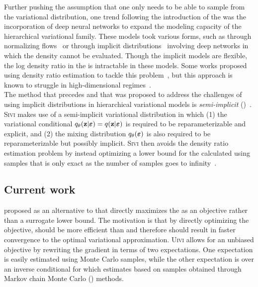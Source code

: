 \documentclass[10pt]{article}
\begin{document}
Further pushing the assumption that one only needs to be able to sample from the variational distribution, one trend following the introduction of the \hvm was the incorporation of deep neural networks to expand the modeling capacity of the hierarchical variational family. These models took various forms, such as through normalizing flows~\citep{Rezende:2015} or through implicit distributions~\citep{Mohamed:2016} involving deep networks in which the density cannot be evaluated. Though the implicit models are flexible, the log density ratio in the \elbo is intractable in these models. Some works proposed using density ratio estimation to tackle this problem~\citep[e.g.,][]{Mohamed:2016,Huszar:2017}, but this approach is known to struggle in high-dimensional regimes~\citep{Sugiyama:2012}.
\\

The method that precedes \uivi and that was proposed to address the challenges of using implicit distributions in hierarchical variational models is \textit{semi-implicit} \vi (\sivi)~\citep{Yin:2018}. \textsc{Sivi} makes use of a semi-implicit variational distribution in which (1) the variational conditional $q_\theta(\mathbf{z}|\bm{\varepsilon})=q(\mathbf{z}|\bm{\varepsilon})$ is required to be reparameterizable and explicit, and (2) the mixing distribution $q_\theta(\bm{\varepsilon})$ is also required to be reparameterizable but possibly implicit. \textsc{Sivi} then avoids the density ratio estimation problem by instead optimizing a lower bound for the \elbo calculated using samples that is only exact as the number of samples goes to infinity~\citep{Yin:2018,Molchanov:2019}.


\subsection{Current work} \label{an:uivi}

\citet{Titsias:2019} proposed \uivi as an alternative to \sivi that directly maximizes the \elbo as an objective rather than a surrogate lower bound. The motivation is that by directly optimizing the \elbo objective, \uivi should be more efficient than \sivi and therefore should result in faster convergence to the optimal variational approximation. \textsc{Uivi} allows for an unbiased \elbo objective by rewriting the \elbo gradient in terms of two expectations. One expectation is easily estimated using Monte Carlo samples, while the other expectation is over an inverse conditional for which \uivi estimates based on samples obtained through Markov chain Monte Carlo (\mcmc) methods.
\end{document}
